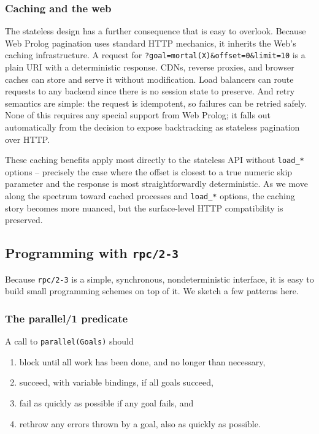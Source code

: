 \subsubsection{Caching and the web}

The stateless design has a further consequence that is easy to
overlook. Because Web Prolog pagination uses standard HTTP mechanics,
it inherits the Web's caching infrastructure. A request for
\texttt{?goal=mortal(X)\&offset=0\&limit=10} is a plain URI with a
deterministic response. CDNs, reverse proxies, and browser caches
can store and serve it without modification. Load balancers can route
requests to any backend since there is no session state to preserve.
And retry semantics are simple: the request is idempotent, so
failures can be retried safely. None of this requires any special
support from Web Prolog; it falls out automatically from the decision
to expose backtracking as stateless pagination over HTTP.

These caching benefits apply most directly to the stateless API
without \texttt{load\_*} options -- precisely the case where the
offset is closest to a true numeric skip parameter and the response
is most straightforwardly deterministic. As we move along the
spectrum toward cached processes and \texttt{load\_*} options, the
caching story becomes more nuanced, but the surface-level HTTP
compatibility is preserved.


\subsection{Programming with \texttt{rpc/2-3}}\label{sec:programming-with-rpc}

Because \texttt{rpc/2-3} is a simple, synchronous, nondeterministic interface, it is easy to build small programming schemes on top of it. We sketch a few patterns here.


\subsubsection{The parallel/1 predicate}\label{sec:parallel-pred}

A call to \texttt{parallel(Goals)} should

\begin{enumerate}
\item block until all work has been done, and no longer than necessary,
\item succeed, with variable bindings, if all goals succeed,
\item fail as quickly as possible if any goal fails, and 
\item rethrow any errors thrown by a goal, also as quickly as possible.
\end{enumerate}

